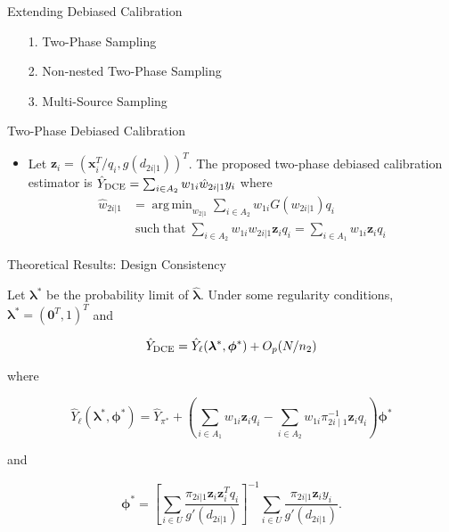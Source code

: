 \documentclass{beamer} %
\DeclareMathOperator*{\argmin}{arg\,min}
\DeclareMathOperator*{\suchthat}{such\; that}
\renewcommand{\bf}[1]{\mathbf{#1}}
\begin{document}
\begin{frame}{Extending Debiased Calibration}

  \begin{itemize}
    \item[1.] Two-Phase Sampling
    \item[2.] Non-nested Two-Phase Sampling
    \item[3.] Multi-Source Sampling
  \end{itemize}

\end{frame}

\begin{frame}{Two-Phase Debiased Calibration}

  \begin{itemize}
    \item Let $\bf z_i = (\bf x_i^T/q_i, g(d_{2i|1}))^T$. The proposed two-phase
      debiased calibration estimator is $\hat Y_{\rm{DCE}} = \sum_{i \in A_2} w_{1i}
      \hat w_{2i|1} y_i$ where 
    \begin{align}\label{eq:primal}
      \hat w_{2i|1} 
      &= \argmin_{w_{2|1}} \sum_{i \in A_2} w_{1i} G(w_{2i|1}) q_i \\ \nonumber
      &\suchthat
      \sum_{i \in A_2} w_{1i} w_{2i|1} \bf z_i q_i = 
      \sum_{i \in A_1} w_{1i} \bf z_i q_i
    \end{align}

  \end{itemize}

\end{frame}

\begin{frame}{Theoretical Results: Design Consistency}

\begin{theorem}\label{thm:dc1}
  Let $\bm \lambda^*$ be the probability limit of $\hat{\bm \lambda}$.
  Under some regularity conditions, $\bm \lambda^* = (\bf 0^T, 1)^T$ and

  $$\hat Y_{\rm{DCE}} = \hat Y_\ell(\bm \lambda^*, \bm \phi^*) + O_p(N / n_2)$$

  where
  \vspace{-0.3cm}

  $$\hat Y_{\ell}(\bm \lambda^*, \bm \phi^*) = \hat Y_{\pi^*}+ 
  \left(\sum_{i \in A_1} w_{1i} \bf z_i q_i - \sum_{i \in A_2} w_{1i} 
    \pi_{2i \mid 1}^{-1}  \bf z_i q_i\right)\bm \phi^*$$

  \vspace{-0.3cm}
  and

  $$\bm \phi^* = 
  \left[\sum_{i \in U} \frac{\pi_{2i|1}\bf z_i \bf z_i^T q_i}{g'(d_{2i|1})}\right]^{-1}
  \sum_{i \in U} \frac{\pi_{2i|1}\bf z_i y_i}{g'(d_{2i|1})}.$$

\end{theorem}

\end{frame}
\end{document}
